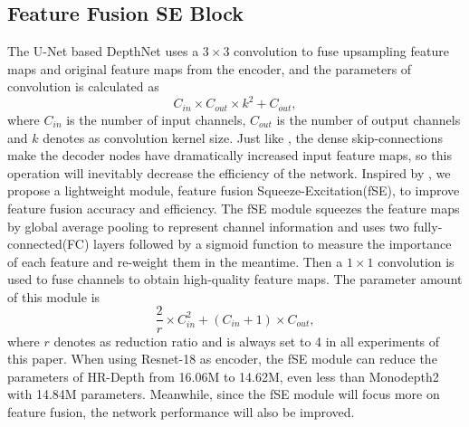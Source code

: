 \documentclass[letterpaper]{article} \usepackage{aaai21}  \usepackage{times}  \usepackage{helvet} \usepackage{courier}  \usepackage[hyphens]{url}  \usepackage{graphicx} \urlstyle{rm} \def\UrlFont{\rm}  \usepackage{natbib}  \usepackage{caption} \frenchspacing  \setlength{\pdfpagewidth}{8.5in}  \setlength{\pdfpageheight}{11in}  \usepackage{booktabs}
\begin{document}
\subsection{Feature Fusion SE Block}
The U-Net based DepthNet uses a $3\times3$ convolution to fuse upsampling feature maps and original feature maps from the encoder, and the parameters of convolution is calculated as
\begin{equation}
    C_{in}\times C_{out}\times k^2  + C_{out},
\end{equation}
where $C_{in}$ is the number of input channels, $C_{out}$ is the number of output channels and $k$ denotes as convolution kernel size.
Just like \cite{huang2017densely}, the dense skip-connections make the decoder nodes have dramatically increased input feature maps, so this operation will inevitably decrease the efficiency of the network. 
Inspired by \cite{hu2019squeeze-and-excitation}, we propose a lightweight module, feature fusion Squeeze-Excitation(fSE), to improve feature fusion accuracy and efficiency. The fSE module squeezes
the feature maps by global average pooling to represent channel information and uses two fully-connected(FC) layers followed by a sigmoid function to measure the importance of each feature and re-weight
them in the meantime. Then a $1\times1$ convolution is used to fuse channels to obtain high-quality feature maps. The parameter amount of this module is
\begin{equation}
    \frac{2}{r}\times C_{in}^2 + (C_{in} + 1)\times C_{out},
\end{equation}
where $r$ denotes as reduction ratio and is always set to 4 in all experiments of this paper. When using Resnet-18 as encoder, the fSE module can reduce the parameters of HR-Depth from 16.06M to 14.62M, even less 
than Monodepth2 with 14.84M parameters. Meanwhile, since the fSE module will focus more on feature fusion, the network performance will also be improved.
\end{document}
